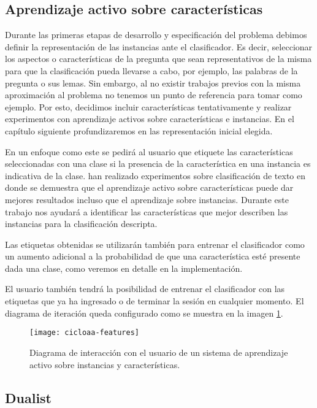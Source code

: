 \subsection{Aprendizaje activo sobre características}

Durante las primeras etapas de desarrollo y especificación del problema debimos definir la representación de las instancias ante el clasificador. Es decir, seleccionar los aspectos o características de la pregunta que sean representativos de la misma para que la clasificación pueda llevarse a cabo, por ejemplo, las palabras de la pregunta o sus lemas. Sin embargo, al no existir trabajos previos con la misma aproximación al problema no tenemos un punto de referencia para tomar como ejemplo. Por esto, decidimos incluir características tentativamente y realizar experimentos con aprendizaje activos sobre características e instancias. En el capítulo siguiente profundizaremos en las representación inicial elegida.

En un enfoque como este se pedirá al usuario que etiquete las características seleccionadas con una clase si la presencia de la característica en una instancia es indicativa de la clase. \citet{settles-al-features} han realizado experimentos sobre clasificación de texto en donde se demuestra que el aprendizaje activo sobre características puede dar mejores resultados incluso que el aprendizaje sobre instancias. Durante este trabajo nos ayudará a identificar las características que mejor describen las instancias para la clasificación descripta.

Las etiquetas obtenidas se utilizarán también para entrenar el clasificador como un aumento adicional a la probabilidad de que una característica esté presente dada una clase, como veremos en detalle en la implementación.

El usuario también tendrá la posibilidad de entrenar el clasificador con las etiquetas que ya ha ingresado o de terminar la sesión en cualquier momento. El diagrama de iteración queda configurado como se muestra en la imagen \ref{aa-features}.

\begin{figure}[h!]
\caption{Diagrama de interacción con el usuario de un sistema de aprendizaje activo sobre instancias y características.}\label{aa-features}
\texttt{[image: cicloaa-features]}
\centering
\end{figure}

\subsection{Dualist}


